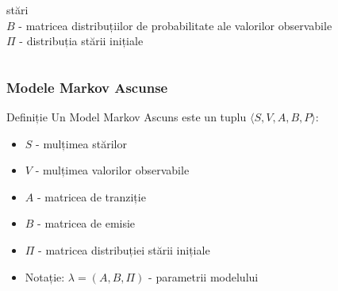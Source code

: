 \begin{frame}
\begin{columns}[T]
{      stări\\\vspace*{.5em}%
      $B$ - matricea distribuțiilor de probabilitate ale valorilor observabile\\\vspace*{.5em}%
      $\Pi$ - distribuția stării inițiale%
    }%
  \end{columns}
\end{frame}

\begin{frame}
  \frametitle{Modele Markov Ascunse}
  \begin{block}{Definiție}
    Un \alert{Model Markov Ascuns} este un tuplu $\langle S,V,A,B,P \rangle$:
    \begin{itemize}
    \item $S$ - mulțimea stărilor
    \item $V$ - mulțimea valorilor observabile
    \item $A$ - matricea de tranziție
    \item $B$ - matricea de emisie
    \item $\Pi$ - matricea distribuției stării inițiale
    \end{itemize}
  \end{block}
  \begin{itemize}
  \item Notație: $\lambda=(A,B,\Pi)$ - parametrii modelului
  \end{itemize}
  \vspace*{.5em}
  \begin{center}%
  \end{center}
\end{frame}


